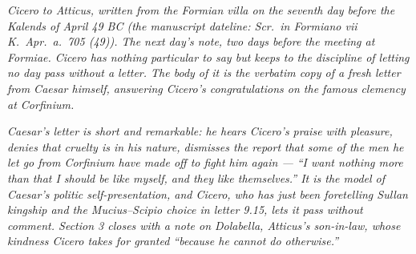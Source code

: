 
\textit{Cicero to Atticus, written from the Formian villa
on the seventh day before the Kalends of April 49 BC
(the manuscript dateline: \textit{Scr.\ in Formiano vii
K.\ Apr.\ a.\ 705 (49)}). The next day's note, two days
before the meeting at Formiae. Cicero has nothing
particular to say but keeps to the discipline of letting
no day pass without a letter. The body of it is the
verbatim copy of a fresh letter from Caesar himself,
answering Cicero's congratulations on the famous
clemency at Corfinium.}

\textit{Caesar's letter is short and remarkable: he
hears Cicero's praise with pleasure, denies that
cruelty is in his nature, dismisses the report that
some of the men he let go from Corfinium have made
off to fight him again --- ``I want nothing more
than that I should be like myself, and they like
themselves.'' It is the model of Caesar's politic
self-presentation, and Cicero, who has just been
foretelling Sullan kingship and the Mucius--Scipio
choice in letter 9.15, lets it pass without comment.
Section 3 closes with a note on Dolabella, Atticus's
son-in-law, whose kindness Cicero takes for granted
``because he cannot do otherwise.''}
